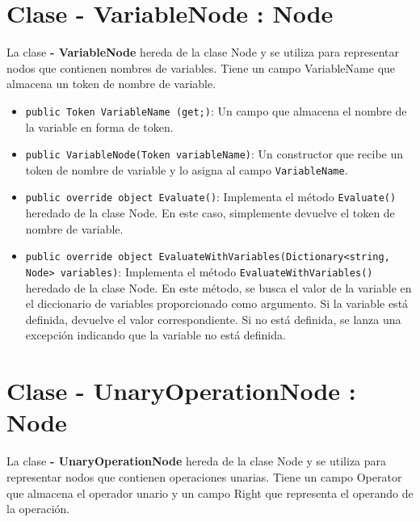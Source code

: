 \documentclass{article}
\newcommand{\subclassed}[1]{\textcolor{classcolor}{\textbf{- #1}}}
\begin{document}
\section{Clase \subclassed{VariableNode} : Node}

La clase \subclassed{VariableNode} hereda de la clase \textcolor{classcolor}{Node} y se utiliza para representar nodos que contienen nombres de variables. Tiene un campo \textcolor{fieldcolor}{VariableName} que almacena un token de nombre de variable.

\begin{itemize}
    \item \lstinline{public Token VariableName (get;)}: Un campo que almacena el nombre de la variable en forma de token.

    \item \lstinline{public VariableNode(Token variableName)}: Un constructor que recibe un token de nombre de variable y lo asigna al campo \lstinline{VariableName}.

    \item \lstinline{public override object Evaluate()}: Implementa el método \lstinline{Evaluate()} heredado de la clase \textcolor{classcolor}{Node}. En este caso, simplemente devuelve el token de nombre de variable.

    \item \lstinline{public override object EvaluateWithVariables(Dictionary<string, Node> variables)}: Implementa el método \lstinline{EvaluateWithVariables()} heredado de la clase \textcolor{classcolor}{Node}. En este método, se busca el valor de la variable en el diccionario de variables proporcionado como argumento. Si la variable está definida, devuelve el valor correspondiente. Si no está definida, se lanza una excepción indicando que la variable no está definida.
\end{itemize}
\section{Clase \subclassed{UnaryOperationNode} : Node}

La clase \subclassed{UnaryOperationNode} hereda de la clase \textcolor{classcolor}{Node} y se utiliza para representar nodos que contienen operaciones unarias. Tiene un campo \textcolor{fieldcolor}{Operator} que almacena el operador unario y un campo \textcolor{fieldcolor}{Right} que representa el operando de la operación.
\end{document}
